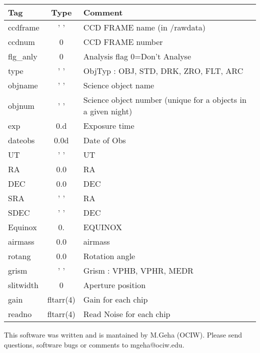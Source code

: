 \documentclass[11pt,letterpaper,dvips]{article}
\begin{document}
\begin{enumerate}
	{\small
	\begin{tabular}{lcl}
	  \hline
	  Tag & Type & Comment \\
	  \hline
         ccdframe   & ' '   & CCD FRAME name (in /rawdata) \\
         ccdnum     & 0     & CCD FRAME number\\
         flg\_anly & 0      &  Analysis flag 0=Don't Analyse \\
         type      & ' '    & ObjTyp : OBJ, STD, DRK, ZRO, FLT, ARC \\
	 objname   & ' '    & Science object name \\
	 objnum    & ' '    & Science object number (unique for a objects in a given night)\\
         exp       & 0.d    & Exposure time \\
         dateobs   & 0.0d   & Date of Obs \\  
         UT        & ' '    & UT \\
         RA        & 0.0    & RA \\
         DEC       & 0.0    & DEC \\
         SRA       & ' '    & RA \\
         SDEC      & ' '    & DEC \\
         Equinox   & 0.     & EQUINOX \\
	 airmass   & 0.0    & airmass\\
	 rotang    & 0.0    & Rotation angle\\
         grism     & ' '    & Grism : VPHB, VPHR, MEDR \\
         slitwidth & 0      & Aperture position \\
         gain     & fltarr(4) & Gain for each chip\\
         readno   & fltarr(4) & Read Noise for each chip \\
  
	  \hline
	\end{tabular}
	} 
	
\end{enumerate}


\hline
This software was written and is mantained by M.Geha (OCIW).  Please
send questions, software bugs or comments to mgeha@ociw.edu.
\end{document}
